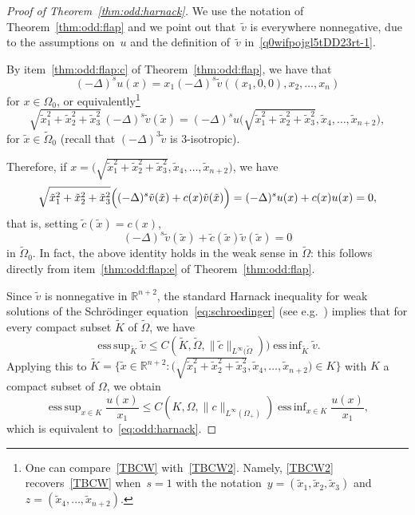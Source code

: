 \documentclass[a4paper,12pt,reqno]{amsart}
\numberwithin{equation}{section}
\theoremstyle{definition}
\theoremstyle{notation}
\DeclareMathOperator*{\esssup}{ess\,sup}
\DeclareMathOperator*{\essinf}{ess\,inf}
\newcommand{\R}{\mathds{R}}
\renewcommand{\le}{\leqslant}
\begin{document}
\begin{proof}[Proof of Theorem~\ref{thm:odd:harnack}]
We use
the notation of Theorem~\ref{thm:odd:flap}
and we point out that~$\tilde{v}$ is everywhere nonnegative, due to the assumptions on~$u$ and the definition of~$\tilde v$
in~\eqref{q0wifpojgl5tDD23rt-1}. 


By item~\ref{thm:odd:flap:c} of Theorem~\ref{thm:odd:flap}, we have that
\[
 (-\Delta)^s u(x) = x_1 (-\Delta)^s \tilde{v}((x_1, 0, 0), x_2, \ldots, x_n)
\]
for $x \in \Omega_0$, or equivalently\footnote{One can compare~\eqref{TBCW}
with~\eqref{TBCW2}. Namely, \eqref{TBCW2} recovers~\eqref{TBCW} when~$s=1$ with the notation~$y=(\tilde x_1,\tilde x_2,\tilde x_3)$ and
$z=(\tilde x_4,\dots,\tilde x_{n+2})$.}
\begin{equation}
\label{TBCW2}
 \sqrt{\tilde{x}_1^2 + \tilde{x}_2^2 + \tilde{x}_3^2} \, (-\Delta)^s \tilde{v}(\tilde{x}) = (-\Delta)^s u \Big (\sqrt{\tilde x_1^2 + \tilde x_2^2 + \tilde x_3^2}, \tilde x_4, \ldots, \tilde x_{n+2} \Big ) ,
\end{equation}
for $\tilde{x} \in \tilde \Omega_0$ (recall that $(-\Delta)^3 \tilde v$ is $3$-isotropic). 


Therefore, if $x = \big  (\sqrt{\tilde x_1^2 + \tilde x_2^2 + \tilde x_3^2}, \tilde x_4, \ldots, \tilde x_{n+2} \big )$, we have
\[
 \sqrt{\tilde{x}_1^2 + \tilde{x}_2^2 + \tilde{x}_3^2} \Bigl( (-\Delta)^s \tilde{v}(\tilde{x}) + c(x) \tilde{v}(\tilde{x}) \Bigr) = (-\Delta)^s u(x) + c(x) u(x) = 0 ,
\]
that is, setting $\tilde{c}(\tilde{x}) = c(x)$,
\begin{equation}
\label{eq:schroedinger}
 (-\Delta)^s \tilde{v}(\tilde{x}) + \tilde{c}(\tilde{x}) \tilde{v}(\tilde{x}) = 0
\end{equation}
in $\tilde \Omega_0$. In fact, the above identity holds in the weak sense in $\tilde \Omega$: this follows directly from item~\ref{thm:odd:flap:e} of Theorem~\ref{thm:odd:flap}.


Since $\tilde{v}$ is nonnegative in $\R^{n + 2}$, the standard Harnack inequality for weak solutions of the Schrödinger equation~\eqref{eq:schroedinger} (see e.g.~\cite[Theorem~1.1]{MR2825646})
implies that for every compact subset $\tilde{K}$ of $\tilde \Omega$, we have
\[
 \esssup_{\tilde{K}} \tilde{v} \le C(\tilde K, \tilde \Omega, \|\tilde c\|_{L^\infty(\tilde \Omega})) \essinf_{\tilde{K}} \tilde{v} .
\]
Applying this to $\tilde{K} = \big \{\tilde x \in \R^{n+2} : \big (\sqrt{\tilde x_1^2 + \tilde x_2^2 + \tilde x_3^2}, \tilde x_4, \ldots, \tilde x_{n+2} \big ) \in K\big \}$ with $K$ a compact subset of $\Omega$, we obtain
\[
 \esssup_{x \in K} \frac{u(x)}{x_1} \le C(K, \Omega, \|c\|_{L^\infty(\Omega_+)}) \essinf_{x \in K} \frac{u(x)}{x_1} ,
\]
which is equivalent to~\eqref{eq:odd:harnack}.
\end{proof}
\end{document}
